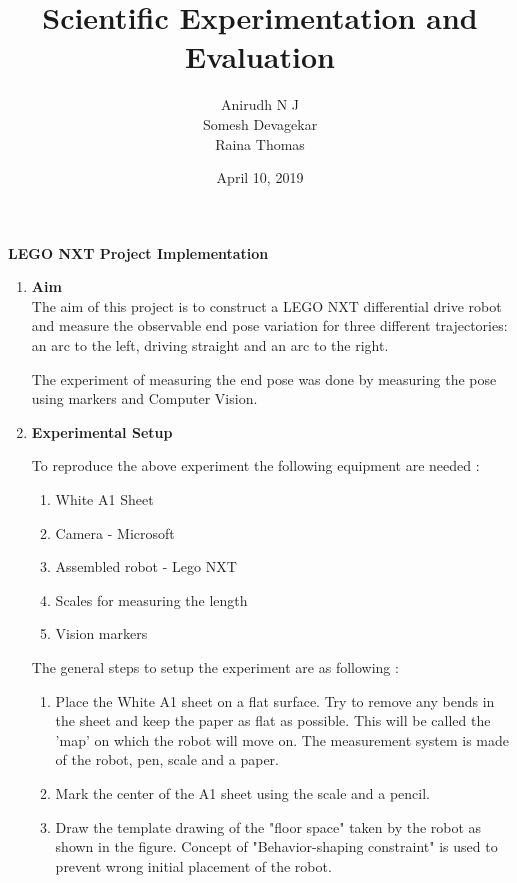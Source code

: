 \documentclass[10pt,a4paper]{article}
\author{\vspace{0.4cm}
	Anirudh N J \\\vspace{0.4cm}
	Somesh Devagekar \\\vspace{0.8cm}
	Raina Thomas}
\title{
	\vspace*{5cm}
	\textbf{Scientific Experimentation and Evaluation}
	}
\date{\color{blue}April 10, 2019}
\begin{document}
	
\begin{titlepage}

	\maketitle
	
\end{titlepage}

\Large\textbf{\color{blue}LEGO NXT Project Implementation}

\Large
\begin{enumerate}[label=\Roman*]

\item
\vspace{0.5cm}
\Large{\textbf{Aim}}\\

The aim of this project is to construct a LEGO NXT differential drive robot and measure the observable end pose variation for three different trajectories: an arc to the left, driving straight and an arc to the right.
\vspace{0.5cm}

The experiment of measuring the end pose was done by measuring the pose using markers and Computer Vision.
   

\vspace{0.5cm}
\item
\Large{\textbf{Experimental Setup}}\\
\vspace{0.5cm}

To reproduce the above experiment the following equipment are needed :
\begin{enumerate}
    \item
    White A1 Sheet
    \item
    Camera - Microsoft 
    \item
    Assembled robot - Lego NXT 
    \item
    Scales for measuring the length 
    \item
    Vision markers
\end{enumerate}
\vspace{0.5cm}

The general steps to setup the experiment are as following :
\begin{enumerate}
    \item
    Place the White A1 sheet on a flat surface.  Try to remove any bends in the sheet and keep the paper as flat as possible. This will be called the 'map' on which the robot will move on. The measurement system is made of the robot, pen, scale and a paper. 
    \item
    Mark the center of the A1 sheet using the scale and a pencil.
    \item
    Draw the template drawing of the "floor space" taken by the robot as shown in the figure. Concept of "Behavior-shaping constraint" is used to prevent wrong initial placement of the robot.
    

\end{enumerate}
\end{enumerate}
\end{document}
